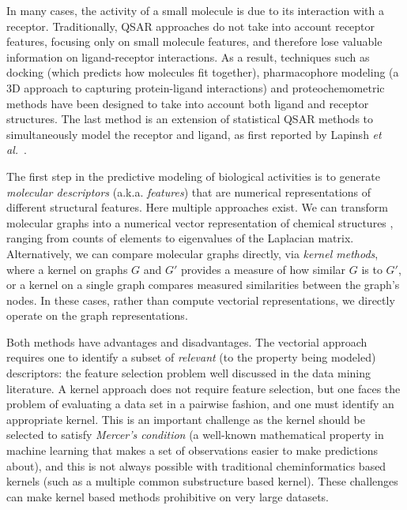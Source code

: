 \documentclass{sig-alternate}
\begin{document}
In many cases, the activity of a small molecule is due to its
interaction with a receptor. Traditionally, QSAR \cite{Hansch:1962vn,
 Free:1964ys} approaches do not take into account receptor features,
focusing only on small molecule features, and therefore lose valuable
information on ligand-receptor interactions. As a result, techniques
such as docking (which predicts how molecules fit together),
pharmacophore modeling (a 3D approach to capturing protein-ligand
interactions) and proteochemometric methods have been designed to take
into account both ligand and receptor structures. The last method is
an extension of statistical QSAR methods to simultaneously
model the receptor and ligand, as first reported by Lapinsh \textit{et
 al.}~\cite{lapinsh2001}.

The first step in the predictive modeling of biological activities is
to generate \emph{molecular descriptors} (a.k.a. \emph{features}) that
are numerical representations of different structural features. Here
multiple approaches exist. We can transform molecular graphs into a
numerical vector representation of chemical structures
\cite{todeschini2000}, ranging from counts of elements to eigenvalues
of the Laplacian matrix.  Alternatively, we can compare molecular
graphs directly, via \emph{kernel methods}, where a kernel on graphs
$G$ and $G'$ provides a measure of how similar $G$ is to $G'$, or a
kernel on a single graph compares measured similarities between the
graph's nodes. In these cases, rather than compute vectorial
representations, we directly operate on the graph representations.

Both methods have advantages and disadvantages. The vectorial approach
requires one to identify a subset of \emph{relevant} (to the property
being modeled) descriptors: the feature selection problem 
well discussed in the data mining literature. A kernel approach
does not require feature selection, but one faces the problem of
evaluating a data set in a pairwise fashion, and one must
identify an appropriate kernel. This is an important challenge as the
kernel should be selected to satisfy \emph{Mercer's condition} (a
well-known mathematical property in machine learning that makes a set
of observations easier to make predictions about), and this is not
always possible with traditional cheminformatics based kernels (such
as a multiple common substructure based kernel). These challenges can
make kernel based methods prohibitive on very large datasets.
\end{document}
